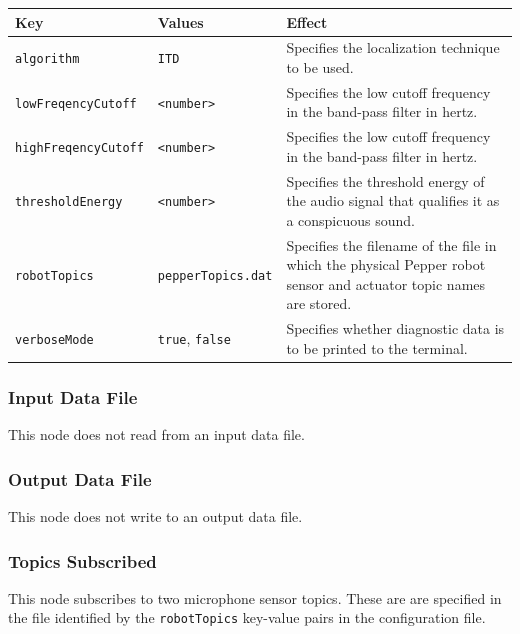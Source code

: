 \documentclass{CSSRforAfrica}
\begin{document}
{{\begin{center}
\begin{tabularx}{\linewidth}{| l | l | X|}
\hline 
{\small Key }                               & {\small Values }                                                 &  {\small Effect}       \\
\hline
{\footnotesize \verb+algorithm+ }  & {\footnotesize \verb+ITD+}     & {\small Specifies the localization technique to be used.} \\ 
\hline
{\footnotesize \verb+lowFreqencyCutoff+ }  & {\footnotesize \verb+<number>+}     & {\small Specifies the low cutoff frequency in the band-pass filter in hertz.} \\ 
\hline
{\footnotesize \verb+highFreqencyCutoff+ }  & {\footnotesize \verb+<number>+}     & {\small Specifies the low cutoff frequency in the band-pass filter in hertz.} \\ 
\hline
{\footnotesize \verb+thresholdEnergy+ }  & {\footnotesize \verb+<number>+}     & {\small Specifies the threshold energy of the audio signal that qualifies it as a conspicuous sound.} \\ 
\hline
{\footnotesize \verb+robotTopics+ }  & {\footnotesize \verb+pepperTopics.dat+}     & {\small Specifies the filename of the file in which the physical Pepper robot sensor and actuator topic names are stored.} \\
\hline
{\footnotesize \verb+verboseMode+}  & {\footnotesize \verb+true+, \verb+false+}     & {\small Specifies whether diagnostic data is to be printed to the terminal.} \\
\hline
\end{tabularx}
\end{center}


\subsubsection*{Input Data File}
This node does not read from an input data file.


\subsubsection*{Output Data File}
This node does not write to an output data file.


\subsubsection*{Topics Subscribed}
This node  subscribes to two microphone sensor topics.  
These are are specified in the file identified by the {\small \verb+robotTopics+ }    key-value pairs in the configuration file.

}}
\end{document}
